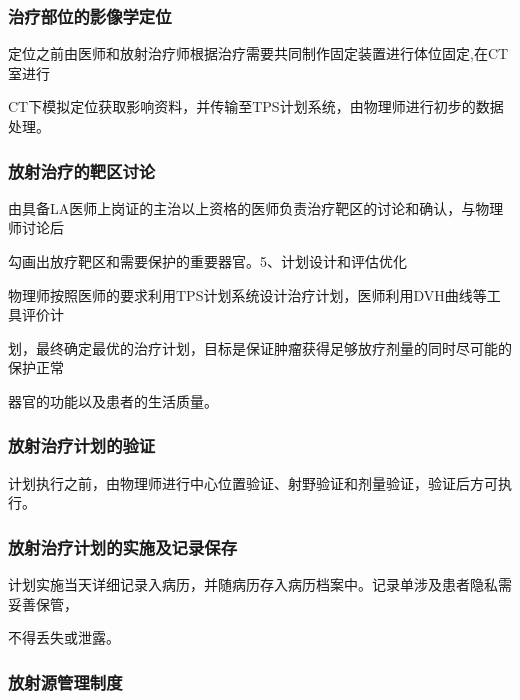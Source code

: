 \subsubsection{治疗部位的影像学定位}

定位之前由医师和放射治疗师根据治疗需要共同制作固定装置进行体位固定,在CT室进行

CT下模拟定位获取影响资料，并传输至TPS计划系统，由物理师进行初步的数据处理。

\subsubsection{放射治疗的靶区讨论}

由具备LA医师上岗证的主治以上资格的医师负责治疗靶区的讨论和确认，与物理师讨论后

勾画出放疗靶区和需要保护的重要器官。5、计划设计和评估优化

物理师按照医师的要求利用TPS计划系统设计治疗计划，医师利用DVH曲线等工具评价计

划，最终确定最优的治疗计划，目标是保证肿瘤获得足够放疗剂量的同时尽可能的保护正常

器官的功能以及患者的生活质量。

\subsubsection{放射治疗计划的验证}

计划执行之前，由物理师进行中心位置验证、射野验证和剂量验证，验证后方可执行。

\subsubsection{放射治疗计划的实施及记录保存}

计划实施当天详细记录入病历，并随病历存入病历档案中。记录单涉及患者隐私需妥善保管，

不得丢失或泄露。

\subsubsection{放射源管理制度}

